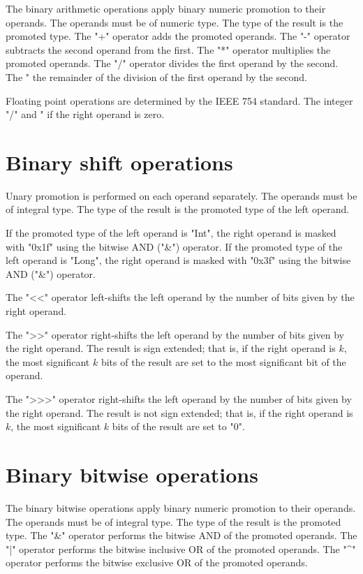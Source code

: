 The binary arithmetic operations apply binary numeric promotion
to their operands. The operands must be of numeric type.
The type of the result is the promoted type.
The
\xcd"+" operator adds the promoted operands. The \xcd"-" operator
subtracts the second operand from the first. The \xcd"*" operator
multiplies the  promoted  operands. The \xcd"/" operator
divides the
first  operand  by the second.
The \xcd"%
the remainder of the division of the first operand by the
second.

Floating point operations are determined by the IEEE 754
standard. 
The integer \xcd"/" and \xcd"%
if the right operand is zero.

\section{Binary shift operations}

Unary promotion is performed on each operand separately. 
The operands must be of integral type.
The type of the result is the promoted type of the left operand.

If the promoted type of the left operand is \xcd"Int",
the right operand is masked with \xcd"0x1f" using the bitwise
AND (\xcd"&") operator.
If the promoted type of the left operand is \xcd"Long",
the right operand is masked with \xcd"0x3f" using the bitwise
AND (\xcd"&") operator.

The \xcd"<<" operator left-shifts the left operand by the number of
bits given by the right operand.

The \xcd">>" operator right-shifts the left operand by the number of
bits given by the right operand.  The result is sign extended;
that is, if the right operand is $k$,
the most significant $k$ bits of the result are set to the most
significant bit of the operand.

The \xcd">>>" operator right-shifts the left operand by the number of
bits given by the right operand.  The result is not sign extended;
that is, if the right operand is $k$,
the most significant $k$ bits of the result are set to \xcd"0".

\section{Binary bitwise operations}

The binary bitwise operations apply binary numeric promotion
to their operands. The operands must be of integral type.
The type of the result is the promoted type.
The \xcd"&" operator  performs the bitwise AND of the promoted operands.
The \xcd"|" operator  performs the bitwise inclusive OR of the promoted operands.
The \xcd"^" operator  performs the bitwise exclusive OR of the promoted operands.


